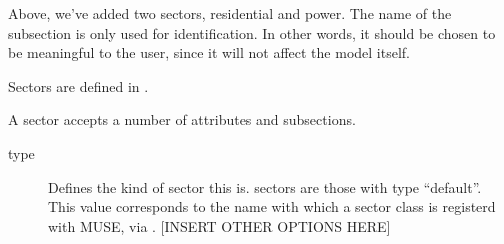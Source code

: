 \documentclass[letterpaper,10pt,english]{sphinxmanual}
\begin{document}
Above, we’ve added two sectors, residential and power. The name of the subsection is
only used for identification. In other words, it should be chosen to be meaningful to
the user, since it will not affect the model itself.

Sectors are defined in .

A sector accepts a number of attributes and subsections.

\label{\detokenize{inputs/toml:sector-type}}\begin{description}
\item[{type}] \leavevmode
Defines the kind of sector this is.  sectors are those with type
“default”. This value corresponds to the name with which a sector class is registerd
with MUSE, via . {[}INSERT OTHER OPTIONS HERE{]}

\end{description}
\end{document}
